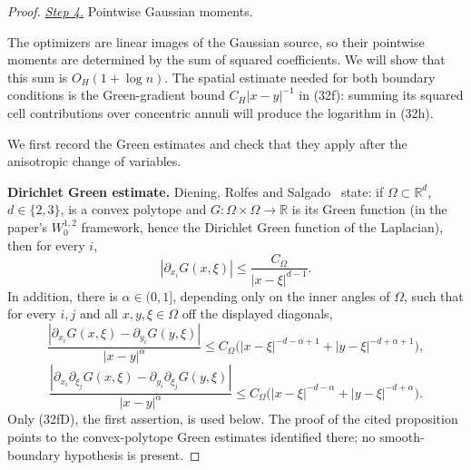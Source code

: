 \documentclass{smfart}
\theoremstyle{definition}
\newcommand{\1}{\mathbf 1}
\begin{document}
\begin{proof}
\smallskip\noindent
\underline{\textit{Step 4.}} Pointwise Gaussian moments.

The optimizers are linear images of the Gaussian source, so their
pointwise moments are determined by the sum of squared coefficients.
We will show that this sum is $O_H(1+\log n)$.  The spatial estimate
needed for both boundary conditions is the Green-gradient bound
$C_H|x-y|^{-1}$ in (32f): summing its squared cell contributions over
concentric annuli will produce the logarithm in (32h).

We first record the Green estimates and check that they apply after
the anisotropic change of variables.

\textbf{Dirichlet Green estimate.}  Diening, Rolfes and Salgado~\cite[Proposition 4.1]{DRS2024} state: if
$\Omega\subset\mathbb R^d$, $d\in\{2,3\}$, is a convex polytope and
$G:\Omega\times\Omega\to\mathbb R$ is its Green function (in the
paper's $W^{1,2}_ 0$ framework, hence the Dirichlet Green function of
the Laplacian), then for every $i$,
\begin{equation}
|\partial_ {x_ i}G(x,\xi)|\leq \frac{C_\Omega}{|x-\xi|^{d-1}}.
\tag{32fD}
\end{equation}
In addition, there is $\alpha\in(0,1]$, depending only on the inner
angles of $\Omega$, such that for every $i,j$ and all
$x,y,\xi\in\Omega$ off the displayed diagonals,
\begin{equation*}
\frac{|\partial_{x_i}G(x,\xi)-\partial_{y_i}G(y,\xi)|}{|x-y|^\alpha}
\leq C_ \Omega\bigl(
|x-\xi|^{-d-\alpha+1}+|y-\xi|^{-d+\alpha+1}\bigr),
\end{equation*}
\begin{equation*}
\frac{|\partial_{x_i}\partial_{\xi_j}G(x,\xi)-\partial_{y_i}\partial_{\xi_j}G(y,\xi)|}{|x-y|^\alpha}
\leq C_ \Omega\bigl(
|x-\xi|^{-d-\alpha}+|y-\xi|^{-d+\alpha}\bigr).
\end{equation*}
Only (32fD), the first assertion, is used below.  The proof of the cited
proposition points to the convex-polytope Green estimates identified there;
no smooth-boundary hypothesis is present.


\end{proof}
\end{document}
